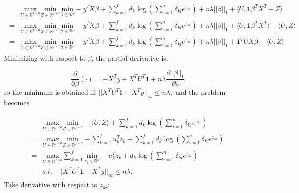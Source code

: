 \begin{gather}
    \label{eq:dual+u}
    \begin{aligned}
        &\underset{U\in \mathbb{R}^{f\times n}}{\mathrm{max}}\underset{Z\in \mathbb{R}^{f\times n}}{\mathrm{min}}\underset{\beta\in \mathbb{R}^p}{\mathrm{min}}-y^TX\beta+\sum_{k=1}^f d_k\log\left(\sum_{i=1}^n \delta_{ki} e^{z_{ki}}\right)+n\lambda||\beta||_1+\langle U,\mathbf{1}\beta^TX^T-Z\rangle\\
        =&\underset{U\in \mathbb{R}^{f\times n}}{\mathrm{max}}\underset{Z\in \mathbb{R}^{f\times n}}{\mathrm{min}}\underset{\beta\in \mathbb{R}^p}{\mathrm{min}}-y^TX\beta+\sum_{k=1}^f d_k\log\left(\sum_{i=1}^n \delta_{ki} e^{z_{ki}}\right)+n\lambda||\beta||_1+\langle U,\mathbf{1}\beta^TX^T\rangle-\langle U,Z\rangle\\
        =&\underset{U\in \mathbb{R}^{f\times n}}{\mathrm{max}}\underset{Z\in \mathbb{R}^{f\times n}}{\mathrm{min}}\underset{\beta\in \mathbb{R}^p}{\mathrm{min}}-y^TX\beta+\sum_{k=1}^f d_k\log\left(\sum_{i=1}^n \delta_{ki} e^{z_{ki}}\right)+n\lambda||\beta||_1+\mathbf{1}^TUX\beta-\langle U,Z\rangle
    \end{aligned}    
\end{gather}
Minimizing with respect to $\beta$, the partial derivative is:

\begin{equation}
    \label{eq:partialbeta}
    \frac{\partial}{\partial\beta}(\cdot) =-X^Ty+X^TU^T\mathbf{1}+n\lambda\frac{\partial||\beta||_1}{\partial\beta}
\end{equation}
so the minimum is obtained iff $
    ||X^TU^T\mathbf{1}-X^Ty||_\infty\leq n\lambda,$ and the problem becomes:

\begin{gather}
    \label{eq:dual-beta}
    \begin{aligned}
        &\underset{U\in \mathbb{R}^{f\times n}}{\mathrm{max}}\underset{Z\in \mathbb{R}^{f\times n}}{\mathrm{min}}- \langle U,Z\rangle+\sum_{k=1}^f d_k\log\left(\sum_{i=1}^n \delta_{ki} e^{z_{ki}}\right)\\
        =&\underset{U\in \mathbb{R}^{f\times n}}{\mathrm{max}}\underset{Z\in \mathbb{R}^{f\times n}}{\mathrm{min}}-\sum_{k=1}^f u_k^Tz_k +\sum_{k=1}^f d_k\log\left(\sum_{i=1}^n \delta_{ki} e^{z_{ki}}\right)\\
        =&\underset{U\in \mathbb{R}^{f\times n}}{\mathrm{max}}\sum_{k=1}^f\underset{z_k\in \mathbb{R}^n}{\mathrm{min}}-u_k^Tz_k+d_k\log\left(\sum_{i=1}^n \delta_{ki} e^{z_{ki}}\right)\\
        &s.t.\quad ||X^TU^T\mathbf{1}-X^Ty||_\infty\leq n\lambda.
    \end{aligned}
\end{gather}
Take derivative with respect to $z_{ki}$:

